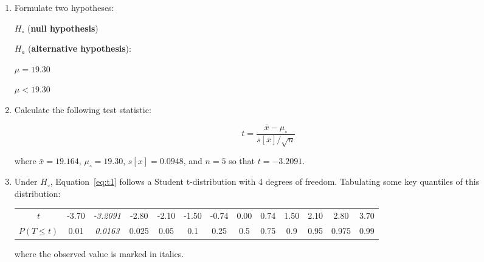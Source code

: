 \begin{enumerate}
\item  Formulate two hypotheses:\\

  \noindent\begin{minipage}{.4\textwidth}
    $H_\circ$ (\textbf{null hypothesis})
    
    \vspace{1em}
    
    $H_a$ (\textbf{alternative hypothesis}):
  \end{minipage}
  \begin{minipage}{.2\textwidth}
  \end{minipage}
  \begin{minipage}{.2\textwidth}
    $\mu=19.30$
    
    \vspace{1em}
    
    $\mu<{19.30}$
  \end{minipage}
  \begin{minipage}{.2\textwidth}
  \end{minipage}
  
\item Calculate the following test statistic:

  \begin{equation}
    t = \frac{\bar{x} - \mu_\circ}{s[x]/\sqrt{n}}
    \label{eq:t1}
  \end{equation}

  \noindent where $\bar{x} = 19.164$, $\mu_\circ = 19.30$, 
  $s[x] = 0.0948$, and $n = 5$ so that $t = -3.2091$.

\item Under $H_\circ$, Equation~\ref{eq:t1} follows a Student
  t-distribution with 4 degrees of freedom. Tabulating some key
  quantiles of this distribution:

  \begin{center}
    \begin{tabular}{c|c@{\gap}c@{\gap}c@{\gap}c@{\gap}
        c@{\gap}c@{\gap}c@{\gap}c@{\gap}c@{\gap}c@{\gap}c@{\gap}c}
      $t$ & -3.70 & \emph{-3.2091} & -2.80 & -2.10 & -1.50 & -0.74 &
      0.00 & 0.74 & 1.50 & 2.10 & 2.80 & 3.70 \\
      $P(T\leq{t})$ & 0.01 & \emph{0.0163} & 0.025 & 0.05 & 0.1 & 0.25 &
      0.5 & 0.75 & 0.9 & 0.95 & 0.975 & 0.99
    \end{tabular}
  \end{center}

  \noindent where the observed value is marked in italics.
  

\end{enumerate}
